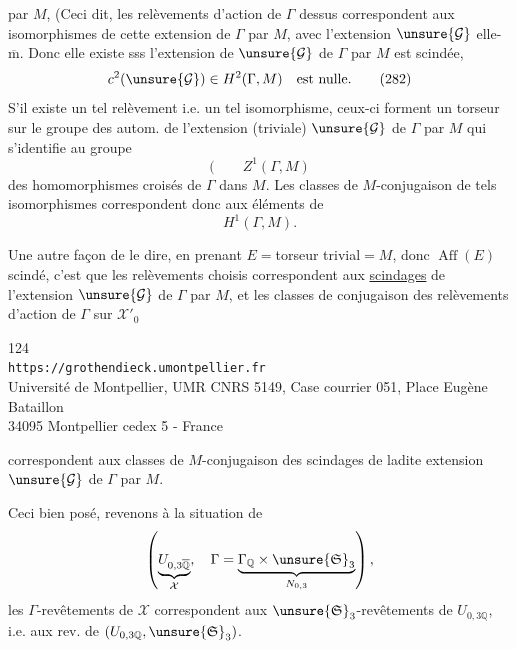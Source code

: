 par $M$,  (Ceci dit, les relèvements d'action de $\Gamma$ dessus correspondent aux isomorphismes de cette extension de $\Gamma$ par $M$, avec l'extension $\unsure{\mathcal G}$ elle-$\overline{\mathrm m}$. Donc elle existe sss l'extension de $\unsure{\mathcal G}$ de $\Gamma$ par $M$ est scindée,  
\[
c^2(\unsure{\mathcal G})\in H^2(\Gamma,M)\quad\text{est nulle.}
\tag{282}
\]
S'il existe un tel relèvement i.e. un tel isomorphisme, ceux-ci forment un torseur sur le groupe des autom. de l'extension (triviale) $\unsure{\mathcal G}$ de $\Gamma$ par $M$ qui s'identifie au groupe
\[
(\qquad Z^1(\Gamma,M)
\]
des homomorphismes croisés de $\Gamma$ dans $M$. Les classes de $M$-conjugaison de tels  isomorphismes correspondent donc aux éléments de
\[
H^1(\Gamma,M).
\]

Une autre façon de le dire, en prenant $E={}$torseur trivial${}=M$, donc $\operatorname{Aff}(E)$ scindé, c'est que les relèvements choisis correspondent aux \uline{scindages} de l'extension $\unsure{\mathcal G}$ de $\Gamma$ par $M$, et les classes de conjugaison des relèvements d'action de $\Gamma$ sur $\mathcal X'_0$


\begin{center}
\small
124\\
\texttt{https://grothendieck.umontpellier.fr}\\
Université de Montpellier, UMR CNRS 5149, Case courrier 051, Place Eugène Bataillon\\
34095 Montpellier cedex 5 - France
\end{center}


correspondent aux classes de $M$-conjugaison des scindages de ladite extension $\unsure{\mathcal G}$ de $\Gamma$ par $M$.

Ceci bien posé, revenons à la situation de
\[
\left(\underbrace{U_{0,3\overline{\mathbb Q}}}_{\mathcal X},\quad
\Gamma=\underbrace{\Gamma_{\mathbb Q}\times\unsure{\mathfrak S}_3}_{N_{0,3}}\right),
\]
les $\Gamma$-revêtements de $\mathcal X$ correspondent aux $\unsure{\mathfrak S}_3$-revêtements de $U_{0,3\mathbb Q}$, i.e. aux rev. de $(U_{0,3\mathbb Q},\unsure{\mathfrak S}_3)$.


